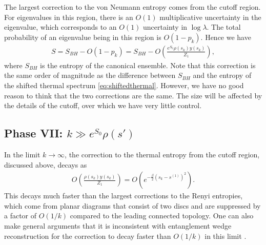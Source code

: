 \documentclass[11pt]{article}
\newcommand{\smax}{s_k}
\newcommand{\sprime}{s'}
\numberwithin{equation}{section}
\begin{document}
The largest correction to the von Neumann entropy comes from the cutoff region. For eigenvalues in this region, there is an $O(1)$ multiplicative uncertainty in the eigenvalue, which corresponds to an $O(1)$ uncertainty in $\log \lambda$. The total probability of an eigenvalue being in this region is $O(1-p_k)$. Hence we have
\begin{align}
S = S_{BH} - O(1-p_k) = S_{BH} - O\left(\frac{e^{S_0} \rho(\smax)y(\smax)}{Z_1}\right),
\end{align}
where $S_{BH}$ is the entropy of the canonical ensemble. Note that this correction is the same order of magnitude as the difference between $S_{BH}$ and the entropy of the shifted thermal spectrum \eqref{eq:shiftedthermal}. However, we have no good reason to think that the two corrections are the same. The size will be affected by the details of the cutoff, over which we have very little control.

\subsection*{Phase VII: $k \gg e^{S_0} \rho(\sprime)$}
In the limit $k \to \infty$, the correction to the thermal entropy from the cutoff region, discussed above, decays as
\begin{align}
O(\frac{\rho(\smax)y(\smax)}{Z_1}) = O(e^{-\frac{\beta}{2}(\smax - s^{(1)})^2}).
\end{align}
This decays much faster than the largest corrections to the Renyi entropies, which come from planar diagrams that consist of two discs and are suppressed by a factor of $O(1/k)$
compared to the leading connected topology. One can also make general arguments that it is inconsistent with entanglement wedge reconstruction for the correction to decay faster than $O(1/k)$ in this limit \cite{Hayden:2018khn}.
\end{document}
